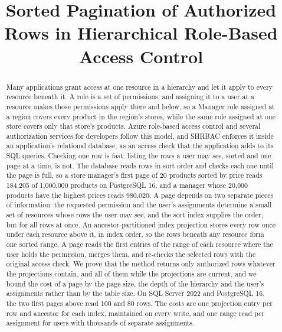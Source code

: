 \documentclass[conference]{IEEEtran}
\begin{document}
\title{Sorted Pagination of Authorized Rows in Hierarchical Role-Based Access Control}
\author{}
\maketitle

\begin{abstract}
Many applications grant access at one resource in a hierarchy and let it apply to every resource beneath it. A role is a set of permissions, and assigning it to a user at a resource makes those permissions apply there and below, so a Manager role assigned at a region covers every product in the region's stores, while the same role assigned at one store covers only that store's products. Azure role-based access control and several authorization services for developers follow this model, and SHRBAC enforces it inside an application's relational database, as an access check that the application adds to its SQL queries. Checking one row is fast; listing the rows a user may see, sorted and one page at a time, is not. The database reads rows in sort order and checks each one until the page is full, so a store manager's first page of 20 products sorted by price reads 184,205 of 1,000,000 products on PostgreSQL 16, and a manager whose 20,000 products have the highest prices reads 980,020. A page depends on two separate pieces of information: the requested permission and the user's assignments determine a small set of resources whose rows the user may see, and the sort index supplies the order, but for all rows at once. An ancestor-partitioned index projection stores every row once under each resource above it, in index order, so the rows beneath any resource form one sorted range. A page reads the first entries of the range of each resource where the user holds the permission, merges them, and re-checks the selected rows with the original access check. We prove that the method returns only authorized rows whatever the projections contain, and all of them while the projections are current, and we bound the cost of a page by the page size, the depth of the hierarchy and the user's assignments rather than by the table size. On SQL Server 2022 and PostgreSQL 16, the two first pages above read 100 and 80 rows. The costs are one projection entry per row and ancestor for each index, maintained on every write, and one range read per assignment for users with thousands of separate assignments.
\end{abstract}
\end{document}
